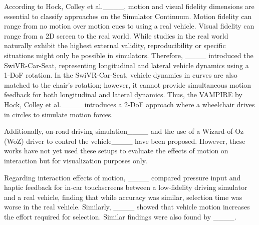 According to Hock, Colley et al.____, motion and visual fidelity dimensions are essential to classify approaches on the Simulator Continuum. Motion fidelity can range from no motion over motion cues to using a real vehicle. Visual fidelity can range from a 2D screen to the real world. While studies in the real world naturally exhibit the highest external validity, reproducibility or specific situations might only be possible in simulators. Therefore, ____ introduced the SwiVR-Car-Seat, representing longitudinal and lateral vehicle dynamics using a 1-DoF rotation. In the SwiVR-Car-Seat, vehicle dynamics in curves are also matched to the chair’s rotation; however, it cannot provide simultaneous motion feedback for both longitudinal and lateral dynamics. Thus, the VAMPIRE by Hock, Colley et al.____ introduces a 2-DoF approach where a wheelchair drives in circles to simulate motion forces.

Additionally, on-road driving simulation____ and the use of a Wizard-of-Oz (WoZ) driver to control the vehicle____ have been proposed. However, these works have not yet used these setups to evaluate the effects of motion on interaction but for visualization purposes only.

Regarding interaction effects of motion, ____ compared pressure input and haptic feedback for in-car touchscreens between a low-fidelity driving simulator and a real vehicle, finding that while accuracy was similar, selection time was worse in the real vehicle. Similarly, ____ showed that vehicle motion increases the effort required for selection. Similar findings were also found by ____.